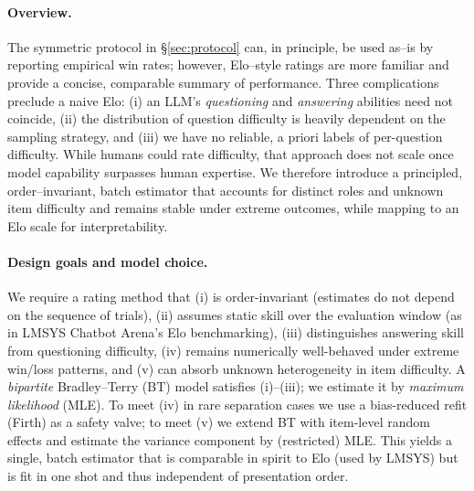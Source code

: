 \documentclass{article} %
\begin{document}

\paragraph{Overview.}
The symmetric protocol in \S\ref{sec:protocol} can, in principle, be used as--is by reporting empirical win rates; however, Elo--style ratings are more familiar and provide a concise, comparable summary of performance. Three complications preclude a naive Elo: (i) an LLM’s \emph{questioning} and \emph{answering} abilities need not coincide, (ii) the distribution of question difficulty is heavily dependent on the sampling strategy, and (iii) we have no reliable, a priori labels of per-question difficulty. While humans could rate difficulty, that approach does not scale once model capability surpasses human expertise. We therefore introduce a principled, order--invariant, batch estimator that accounts for distinct roles and unknown item difficulty and remains stable under extreme outcomes, while mapping to an Elo scale for interpretability.



\paragraph{Design goals and model choice.}
We require a rating method that (i) is order-invariant (estimates do not depend on the sequence of trials), (ii) assumes static skill over the evaluation window (as in LMSYS Chatbot Arena's Elo benchmarking), (iii) distinguishes answering skill from questioning difficulty, (iv) remains numerically well-behaved under extreme win/loss patterns, and (v) can absorb unknown heterogeneity in item difficulty. A \emph{bipartite} Bradley--Terry (BT) model satisfies (i)--(iii); we estimate it by \emph{maximum likelihood} (MLE). To meet (iv) in rare separation cases we use a bias-reduced refit (Firth) as a safety valve; to meet (v) we extend BT with item-level random effects and estimate the variance component by (restricted) MLE. This yields a single, batch estimator that is comparable in spirit to Elo (used by LMSYS) but is fit in one shot and thus independent of presentation order.
\end{document}
